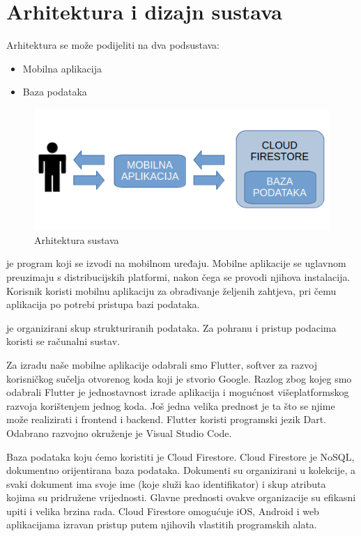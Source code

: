 \chapter{Arhitektura i dizajn sustava}
		
		Arhitektura se može podijeliti na dva podsustava:
	\begin{itemize}
		\item Mobilna aplikacija
		\item Baza podataka
	\end{itemize}
	
	\begin{figure}[h]
		\includegraphics[scale=0.55]{slike/Arhitektura_sustava.PNG}
		\centering
		\caption{Arhitektura sustava}
		\label{fig:Arhitektura_sustava}
	\end{figure}
	
		\textit{} je program koji se izvodi na mobilnom uređaju. Mobilne aplikacije se uglavnom preuzimaju s distribucijskih platformi, nakon čega se provodi njihova instalacija. Korisnik koristi mobilnu aplikaciju za obrađivanje željenih zahtjeva, pri čemu aplikacija po potrebi pristupa bazi podataka.
		
		\textit{} je organizirani skup strukturiranih podataka. Za pohranu i pristup podacima koristi se računalni sustav.
		
		Za izradu naše mobilne aplikacije odabrali smo Flutter, softver za razvoj korisničkog sučelja otvorenog koda koji je stvorio Google. Razlog zbog kojeg smo odabrali Flutter je jednostavnost izrade aplikacija i mogućnost višeplatformskog razvoja korištenjem jednog koda. Još jedna velika prednost je ta što se njime može realizirati i frontend i backend. Flutter koristi programski jezik Dart. Odabrano razvojno okruženje je Visual Studio Code.
		
		Baza podataka koju ćemo koristiti je Cloud Firestore. Cloud Firestore je NoSQL, dokumentno orijentirana baza podataka. Dokumenti su organizirani u kolekcije, a svaki dokument ima svoje ime (koje služi kao identifikator) i skup atributa kojima su pridružene vrijednosti. Glavne prednosti ovakve organizacije su efikasni upiti i velika brzina rada. Cloud Firestore omogućuje iOS, Android i web aplikacijama izravan pristup putem njihovih vlastitih programskih alata.
		
